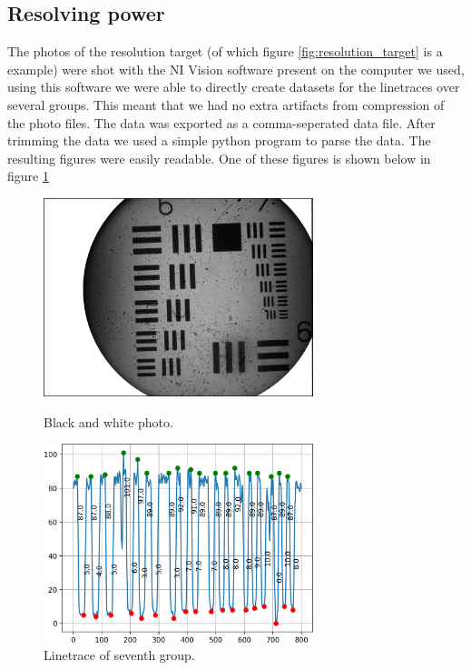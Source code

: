 \subsection{Resolving power}
The photos of the resolution target (of which figure \ref{fig:resolution_target} is a example) were shot with the NI Vision software present on the computer we used, using this software we were able to directly create datasets for the linetraces over several groups. This meant that we had no extra artifacts from compression of the photo files. The data was exported as a comma-seperated data file. After trimming the data we used a simple python program to parse the data. The resulting figures were easily readable. One of these figures is shown below in figure \ref{fig:linetrace}\\
\vspace{-5mm}
\begin{figure}[h!]
    \centering
    \begin{minipage}{.5\textwidth}
      \centering
      \includegraphics[width=0.7\textwidth,keepaspectratio]{afbeeldingen/process_visibility/m3_bw.jpg}
      \caption{Black and white photo.}
      \label{fig:resolution_target}
    \end{minipage}%
    \begin{minipage}{.5\textwidth}
      \centering
      \includegraphics[width=0.7\textwidth,keepaspectratio]{afbeeldingen/process_visibility/m3_rpg_7.png}
      \caption{Linetrace of seventh group.}
      \label{fig:linetrace}
    \end{minipage}
\end{figure}

